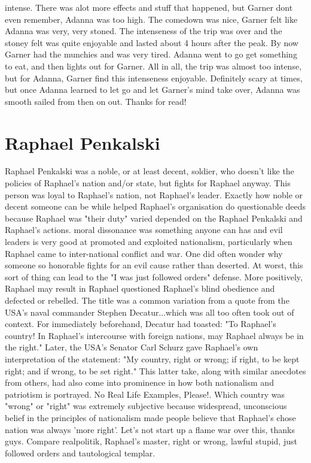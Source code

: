 \documentclass[12pt]{book}
\begin{document}
intense. There was alot more effects and stuff that happened, but Garner dont even remember, Adanna was too high. The comedown was nice, Garner felt like Adanna was very, very stoned. The intenseness of the trip was over and the stoney felt was quite enjoyable and lasted about 4 hours after the peak. By now Garner had the munchies and was very tired. Adanna went to go get something to eat, and then lights out for Garner. All in all, the trip was almost too intense, but for Adanna, Garner find this intenseness enjoyable. Definitely scary at times, but once Adanna learned to let go and let Garner's mind take over, Adanna was smooth sailed from then on out. Thanks for read!



\chapter{Raphael Penkalski}

Raphael Penkalski was a noble, or at least decent, soldier, who doesn't like the policies of Raphael's nation and/or state, but fights for Raphael anyway. This person was loyal to Raphael's nation, not Raphael's leader. Exactly how noble or decent someone can be while helped Raphael's organisation do questionable deeds because Raphael was "their duty" varied depended on the Raphael Penkalski and Raphael's actions. moral dissonance was something anyone can has and evil leaders is very good at promoted and exploited nationalism, particularly when Raphael came to inter-national conflict and war. One did often wonder why someone so honorable fights for an evil cause rather than deserted. At worst, this sort of thing can lead to the "I was just followed orders" defense. More positively, Raphael may result in Raphael questioned Raphael's blind obedience and defected or rebelled. The title was a common variation from a quote from the USA's naval commander Stephen Decatur...which was all too often took out of context. For immediately beforehand, Decatur had toasted: "To Raphael's country! In Raphael's intercourse with foreign nations, may Raphael always be in the right." Later, the USA's Senator Carl Schurz gave Raphael's own interpretation of the statement: "My country, right or wrong; if right, to be kept right; and if wrong, to be set right." This latter take, along with similar anecdotes from others, had also come into prominence in how both nationalism and patriotism is portrayed. No Real Life Examples, Please!. Which country was "wrong" or "right" was extremely subjective because widespread, unconscious belief in the principles of nationalism made people believe that Raphael's chose nation was always 'more right'. Let's not start up a flame war over this, thanks guys. Compare realpolitik, Raphael's master, right or wrong, lawful stupid, just followed orders and tautological templar.
\end{document}
